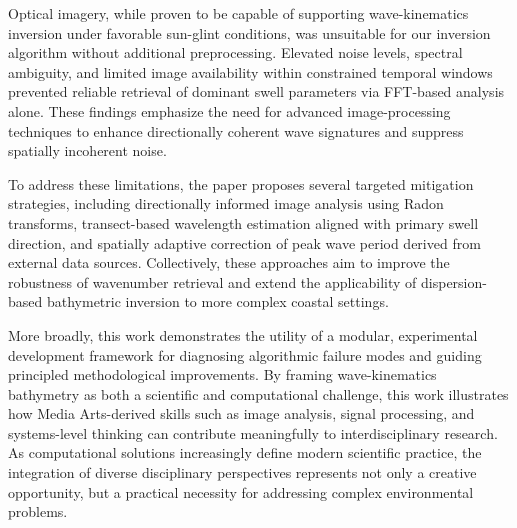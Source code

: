 \documentclass[12pt]{article}
\begin{document}
Optical imagery, while proven to be capable of supporting wave-kinematics inversion under favorable sun-glint conditions, was unsuitable for our inversion algorithm without additional preprocessing. Elevated noise levels, spectral ambiguity, and limited image availability within constrained temporal windows prevented reliable retrieval of dominant swell parameters via FFT-based analysis alone. These findings emphasize the need for advanced image-processing techniques to enhance directionally coherent wave signatures and suppress spatially incoherent noise.

To address these limitations, the paper proposes several targeted mitigation strategies, including directionally informed image analysis using Radon transforms, transect-based wavelength estimation aligned with primary swell direction, and spatially adaptive correction of peak wave period derived from external data sources. Collectively, these approaches aim to improve the robustness of wavenumber retrieval and extend the applicability of dispersion-based bathymetric inversion to more complex coastal settings.

More broadly, this work demonstrates the utility of a modular, experimental development framework for diagnosing algorithmic failure modes and guiding principled methodological improvements. By framing wave-kinematics bathymetry as both a scientific and computational challenge, this work illustrates how Media Arts-derived skills such as image analysis, signal processing, and systems-level thinking can contribute meaningfully to interdisciplinary research. As computational solutions increasingly define modern scientific practice, the integration of diverse disciplinary perspectives represents not only a creative opportunity, but a practical necessity for addressing complex environmental problems.

\printbibliography

\end{document}
